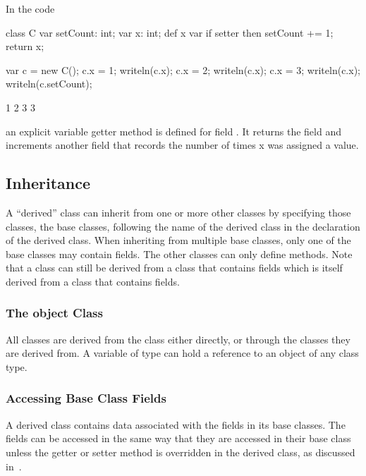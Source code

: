 \begin{example}
In the code
\begin{chapelpre}
\end{chapelpre}
\begin{chapel}
class C {
  var setCount: int;
  var x: int;
  def x var {
    if setter then
      setCount += 1;
    return x;
  }
}
\end{chapel}
\begin{chapelpost}
var c = new C();
c.x = 1;
writeln(c.x);
c.x = 2;
writeln(c.x);
c.x = 3;
writeln(c.x);
writeln(c.setCount);
\end{chapelpost}
\begin{chapeloutput}
1
2
3
3
\end{chapeloutput}
an explicit variable getter method is defined for field .  It
returns the field  and increments another field that records
the number of times x was assigned a value.
\end{example}

\subsection{Inheritance}
\label{Inheritance}

A ``derived'' class can inherit from one or more other classes by
specifying those classes, the base classes, following the name of the
derived class in the declaration of the derived class.  When
inheriting from multiple base classes, only one of the base classes
may contain fields.  The other classes can only define methods.  Note
that a class can still be derived from a class that contains fields
which is itself derived from a class that contains fields.
\subsubsection{The object Class}
\label{The_object_Class}

All classes are derived from the  class either directly, or
through the classes they are derived from. A variable of type 
can hold a reference to an object of any class type. 

\subsubsection{Accessing Base Class Fields}
\label{Accessing_Base_Class_Fields}

A derived class contains data associated with the fields in its base
classes.  The fields can be accessed in the same way that they are
accessed in their base class unless the getter or setter method is
overridden in the derived class, as discussed
in~.

